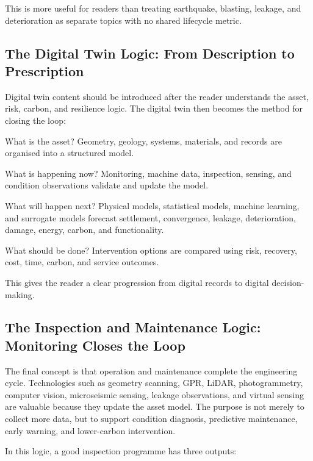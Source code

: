 \documentclass[11pt]{article}
\begin{document}
This is more useful for readers than treating earthquake, blasting, leakage, and
deterioration as separate topics with no shared lifecycle metric.

\subsection{The Digital Twin Logic: From Description to Prescription}

Digital twin content should be introduced after the reader understands the
asset, risk, carbon, and resilience logic. The digital twin then becomes the
method for closing the loop:

\begin{description}[leftmargin=34mm,style=nextline]
  \item[Descriptive] What is the asset? Geometry, geology, systems, materials,
  and records are organised into a structured model.
  \item[Reflective] What is happening now? Monitoring, machine data, inspection,
  sensing, and condition observations validate and update the model.
  \item[Predictive] What will happen next? Physical models, statistical models,
  machine learning, and surrogate models forecast settlement, convergence,
  leakage, deterioration, damage, energy, carbon, and functionality.
  \item[Prescriptive] What should be done? Intervention options are compared
  using risk, recovery, cost, time, carbon, and service outcomes.
\end{description}

This gives the reader a clear progression from digital records to digital
decision-making.

\subsection{The Inspection and Maintenance Logic: Monitoring Closes the Loop}

The final concept is that operation and maintenance complete the engineering
cycle. Technologies such as geometry scanning, GPR, LiDAR, photogrammetry,
computer vision, microseismic sensing, leakage observations, and virtual sensing
are valuable because they update the asset model. The purpose is not merely to
collect more data, but to support condition diagnosis, predictive maintenance,
early warning, and lower-carbon intervention.

In this logic, a good inspection programme has three outputs:
\end{document}
